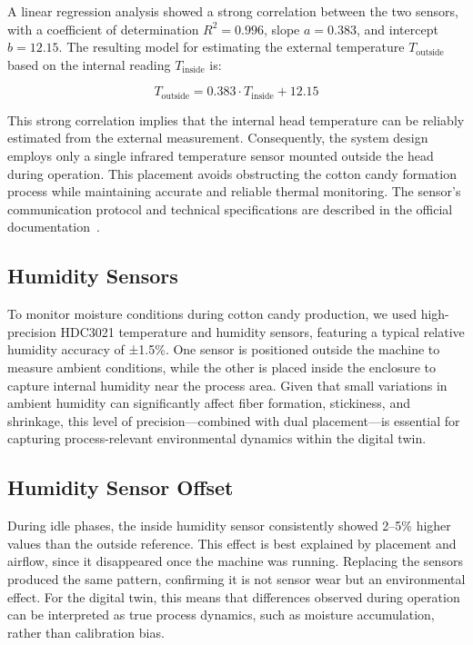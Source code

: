 A linear regression analysis showed a strong correlation between the two sensors, with a coefficient of determination $R^2 = 0.996$, slope $a = 0.383$, and intercept $b = 12.15$. The resulting model for estimating the external temperature $T_{\text{outside}}$ based on the internal reading $T_{\text{inside}}$ is:

\[
T_{\text{outside}} = 0.383 \cdot T_{\text{inside}} + 12.15
\]

This strong correlation implies that the internal head temperature can be reliably estimated from the external measurement. Consequently, the system design employs only a single infrared temperature sensor mounted outside the head during operation. This placement avoids obstructing the cotton candy formation process while maintaining accurate and reliable thermal monitoring. The sensor’s communication protocol and technical specifications are described in the official documentation~\cite{waveshareIRsensor}.

\subsection{Humidity Sensors}
To monitor moisture conditions during cotton candy production, we used high-precision HDC3021 temperature and humidity sensors, featuring a typical relative humidity accuracy of ±1.5\%. One sensor is positioned outside the machine to measure ambient conditions, while the other is placed inside the enclosure to capture internal humidity near the process area. Given that small variations in ambient humidity can significantly affect fiber formation, stickiness, and shrinkage, this level of precision—combined with dual placement—is essential for capturing process-relevant environmental dynamics within the digital twin.

\subsection{Humidity Sensor Offset}
During idle phases, the inside humidity sensor consistently showed 2--5\% higher values than the outside reference. This effect is best explained by placement and airflow, since it disappeared once the machine was running. Replacing the sensors produced the same pattern, confirming it is not sensor wear but an environmental effect. For the digital twin, this means that differences observed during operation can be interpreted as true process dynamics, such as moisture accumulation, rather than calibration bias.

